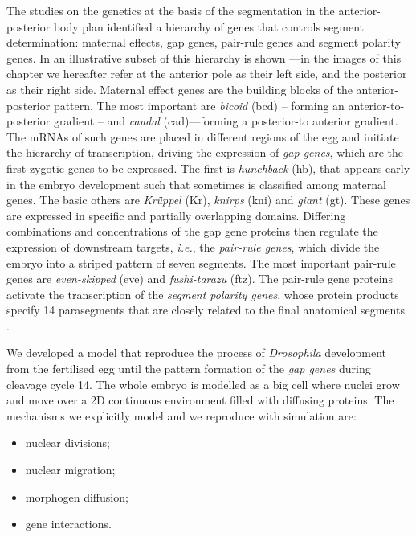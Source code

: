 \documentclass[12pt,a4paper,twoside,openright]{book}
\begin{document}
\noindent The studies on the genetics at the basis of the segmentation in the anterior-posterior body plan identified a hierarchy of genes that controls segment determination: maternal effects, gap genes, pair-rule genes and segment polarity genes. In  an illustrative subset of this hierarchy is shown ---in the images of this chapter we hereafter refer at the anterior pole as their left side, and the posterior as their right side. 
%
Maternal effect genes are the building blocks of the anterior-posterior pattern. The most important are \emph{bicoid} (bcd)  -- forming an anterior-to-posterior gradient -- and \emph{caudal} (cad)---forming a posterior-to anterior gradient. 
%
The mRNAs of such genes are placed in different regions of the egg and initiate the hierarchy of transcription, driving the expression of \emph{gap genes}, which are the first zygotic genes to be expressed. The first is \emph{hunchback} (hb), that appears early in the embryo development such that sometimes is classified among maternal genes. The basic others are \emph{Kr\"{u}ppel} (Kr), \emph{knirps} (kni) and \emph{giant} (gt).
%
These genes are expressed in specific and partially overlapping domains. 
%
Differing combinations and concentrations of the gap gene proteins then regulate the expression of downstream targets, \emph{i.e.}, the \emph{pair-rule genes}, which divide the embryo into a striped pattern of seven segments. The most important pair-rule genes are  \emph{even-skipped} (eve) and  \emph{fushi-tarazu} (ftz).
%
The pair-rule gene proteins activate the transcription of the \emph{segment polarity genes},  whose protein products specify 14 parasegments that are closely related to the final anatomical segments \cite{alberts}.

We developed a model that reproduce the process of \emph{Drosophila} development from the fertilised egg until the pattern formation of the \emph{gap genes} during cleavage cycle 14.
%
The whole embryo is modelled as a big cell where nuclei grow and move over a 2D continuous environment filled with diffusing proteins.
%
The mechanisms we explicitly model and we reproduce with simulation are:
\begin{itemize}
 \item nuclear divisions;
 \item nuclear migration;
 \item morphogen diffusion;
 \item gene interactions.
\end{itemize}
\end{document}
